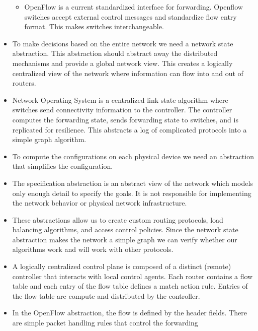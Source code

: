 \documentclass[]{article}
\providecommand{\tightlist}{%
  \setlength{\itemsep}{0pt}\setlength{\parskip}{0pt}}
\begin{document}
\begin{itemize}
  \begin{itemize}
  \tightlist
  \item
    OpenFlow is a current standardized interface for forwarding.
    Openflow switches accept external control messages and standardize
    flow entry format. This makes switches interchangeable.
  \end{itemize}
\item
  To make decisions based on the entire network we need a network state
  abstraction. This abstraction should abstract away the distributed
  mechanisms and provide a global network view. This creates a logically
  centralized view of the network where information can flow into and
  out of routers.
\item
  Network Operating System is a centralized link state algorithm where
  switches send connectivity information to the controller. The
  controller computes the forwarding state, sends forwarding state to
  switches, and is replicated for resilience. This abstracts a log of
  complicated protocols into a simple graph algorithm.
\item
  To compute the configurations on each physical device we need an
  abstraction that simplifies the configuration.
\item
  The specification abstraction is an abstract view of the network which
  models only enough detail to specify the goals. It is not responsible
  for implementing the network behavior or physical network
  infrastructure.
\item
  These abstractions allow us to create custom routing protocols, load
  balancing algorithms, and access control policies. Since the network
  state abstraction makes the network a simple graph we can verify
  whether our algorithms work and will work with other protocols.
\item
  A logically centralized control plane is composed of a distinct
  (remote) controller that interacts with local control agents. Each
  router contains a flow table and each entry of the flow table defines
  a match action rule. Entries of the flow table are compute and
  distributed by the controller.
\item
  In the OpenFlow abstraction, the flow is defined by the header fields.
  There are simple packet handling rules that control the forwarding


\end{itemize}
\end{document}
